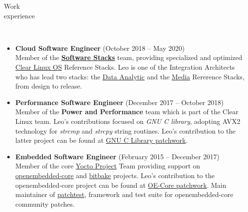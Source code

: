 \documentclass{resume}
\def\intel{Intel Corporation}
\def\cl{Clear Linux OS}
\begin{document}
\begin{category}{Work \\experience}

  \citem{\intel}\\

\begin{itemize}
\item \textbf{Cloud Software Engineer} (October 2018 -- May 2020)\\
  Member of the \href{https://github.com/intel/stacks}{\textbf{Software Stacks}} team,
  providing specialized and optimized \href{https://clearlinux.org/}{\cl} Reference Stacks.
  Leo is one of the Integration Architects who has lead two stacks:
  the \href{https://github.com/intel/stacks/blob/master/dars/dars.rst}{Data Analytic}
  and the \href{https://github.com/intel/stacks/blob/master/mers/README.md}{Media} Rererence Stacks,
  from design to release.
\end{itemize}

\begin{itemize}
\item \textbf{Performance Software Engineer} (December 2017 -- October 2018)\\
  Member of the \textbf{Power and Performance} team which is part of the Clear
  Linux team. Leo's contributions focused on \textit{GNU
    C library}, adopting AVX2 technology for \textit{strcmp} and
  \textit{strcpy} string routines. Leo's contribution to the latter project can be found at
  \href{https://patchwork.ozlabs.org/project/glibc/list/?submitter=74072}{GNU
    C Library patchwork}.
\end{itemize}

\begin{itemize}
\item \textbf{Embedded Software Engineer} (February 2015 -- December 2017)\\
  Member of the core \href{https://www.yoctoproject.org/}{Yocto Project} Team
  providing support on \href{http://cgit.openembedded.org/openembedded-core/}{openembedded-core}
  and \href{http://cgit.openembedded.org/bitbake/}{bitbake} projects. Leo's contribution to 
  the openembedded-core project can be found at
  \href{https://patchwork.openembedded.org/project/oe-core/series/?ordering=-last_updated}{OE-Core patchwork}. Main maintainer of
  \href{http://git.yoctoproject.org/cgit/cgit.cgi/patchtest/}{patchtest}, framework and test suite for openembedded-core 
  community patches.
\end{itemize}


\end{category}
\end{document}

